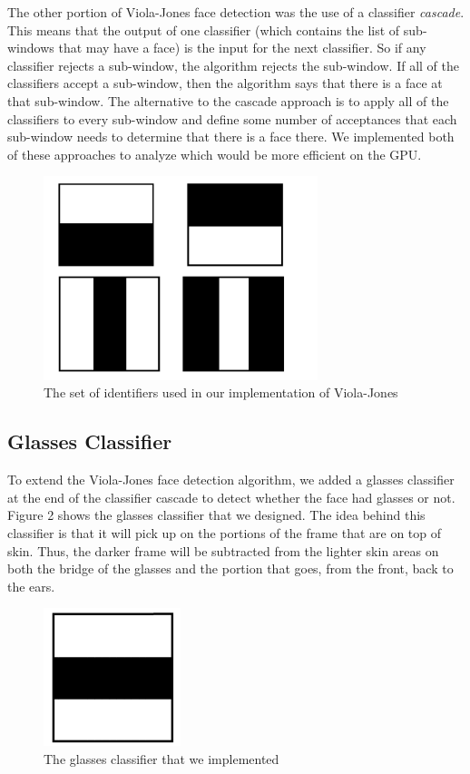 \documentclass[12pt] {article}
\begin{document}
The other portion of Viola-Jones face detection was the use of a classifier \emph{cascade}. This means that the output of one classifier (which contains the list of sub-windows that may have a face) is the input for the next classifier. So if any classifier rejects a sub-window, the algorithm rejects the sub-window. If all of the classifiers accept a sub-window, then the algorithm says that there is a face at that sub-window. The alternative to the cascade approach is to apply all of the classifiers to every sub-window and define some number of acceptances that each sub-window needs to determine that there is a face there. We implemented both of these approaches to analyze which would be more efficient on the GPU.
\begin{figure}[h!]
	\centering
		\includegraphics[width=80mm]{classifiers.pdf}
		\caption{The set of identifiers used in our implementation of Viola-Jones}
\end{figure}


\subsection{Glasses Classifier}
To extend the Viola-Jones face detection algorithm, we added a glasses classifier at the end of the classifier cascade to detect whether the face had glasses or not. Figure 2 shows the glasses classifier that we designed. The idea behind this classifier is that it will pick up on the portions of the frame that are on top of skin. Thus, the darker frame will be subtracted from the lighter skin areas on both the bridge of the glasses and the portion that goes, from the front, back to the ears.
\begin{figure}[h!]
	\centering
		\includegraphics[width=40mm]{glasses_identifier.pdf}
		\caption{The glasses classifier that we implemented}
\end{figure}
\end{document}
